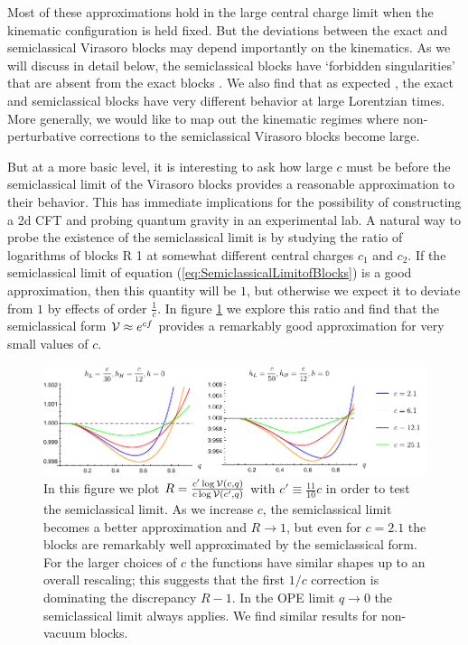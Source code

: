 Most of these approximations hold in the large central charge limit when the kinematic configuration is held fixed.  But the deviations between the exact and semiclassical Virasoro blocks may depend importantly on the kinematics.  As we will discuss in detail below, the semiclassical blocks have `forbidden singularities' that are absent from the exact blocks \cite{Fitzpatrick:2016ive}.  We also find that as expected \cite{Fitzpatrick:2016ive, Fitzpatrick:2016mjq}, the exact and semiclassical blocks have very different behavior at large Lorentzian times.  More generally, we would like to map out the kinematic regimes where non-perturbative corrections to the semiclassical Virasoro blocks become large.  

But at a more basic level, it is interesting to ask how large $c$ must be before the semiclassical limit of the Virasoro blocks provides a reasonable approximation to their behavior.  This has immediate implications for the possibility of constructing a 2d CFT and probing quantum gravity in an experimental lab.  A natural way to probe the existence of the semiclassical limit is by studying the ratio of logarithms of blocks
\be
R \equiv {}  1
\ee
at somewhat different central charges $c_1$ and $c_2$.  If the semiclassical limit of equation (\ref{eq:SemiclassicalLimitofBlocks}) is a good approximation, then this quantity will be $1$, but otherwise we expect it to deviate from $1$ by effects of order $\frac{1}{c}$. In figure \ref{fig:RatioOfLogV} we explore this ratio and find that the semiclassical form ${\cal V} \approx e^{c f}$ provides a remarkably good approximation for very small values of $c$.

\begin{figure}
\centering
\includegraphics[scale=0.95]{virasoro_chapter/RatioOfLogV}	
\caption{In this figure we plot $R = \frac{ c' \log {\cal V}(c,q)}{c \log {\cal V}(c',q)}$ with  $c' \equiv \frac{11}{10}c$ in order to test the semiclassical limit. As we increase $c$, the semiclassical limit becomes a better approximation and $R \to 1$, but even for $c = 2.1$ the blocks are remarkably well approximated by the semiclassical form. For the larger choices of $c$ the functions have similar shapes up to an overall rescaling; this suggests that the first $1/c$ correction is dominating the discrepancy $R-1$.  In the OPE limit $q\rightarrow 0$ the semiclassical limit always applies. We find similar results for non-vacuum blocks. }
\label{fig:RatioOfLogV}
\end{figure}

